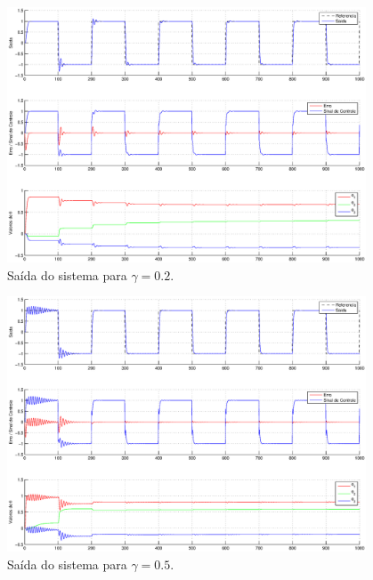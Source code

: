\begin{figure}[htb]
    \centering
    \includegraphics[width=0.95\textwidth]{imgs/questao3/saida_gamma_0.2.eps}
    \caption{Saída do sistema para $\gamma = 0.2$.}
    \label{fig:q3_saida_gamma_0.2}
\end{figure}

\begin{figure}[H]
    \centering
    \includegraphics[width=0.95\textwidth]{imgs/questao3/saida_gamma_0.5.eps}
    \caption{Saída do sistema para $\gamma = 0.5$.}
    \label{fig:q3_saida_gamma_0.5}
\end{figure}

